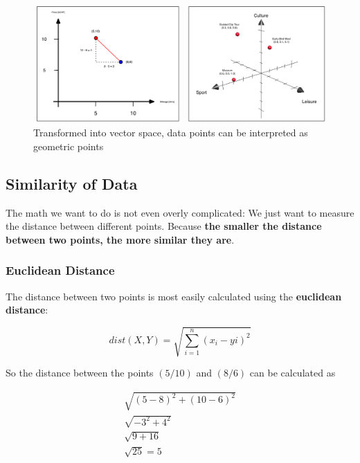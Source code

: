 \documentclass[11pt]{article}
\begin{document}
\begin{figure}[htb!]
    \centering
    \includegraphics[keepaspectratio=true, width=\linewidth]{geometric_interpretation.png}
    \caption{Transformed into vector space, data points can be interpreted as geometric points}
    \label{fig:geometric_intepretation}
\end{figure}

\newpage

\subsection{Similarity of Data}

The math we want to do is not even overly complicated: We just want to measure the distance between different points. Because \textbf{the smaller the distance between two points, the more similar they are}.

\subsubsection{Euclidean Distance}

The distance between two points is most easily calculated using the \textbf{euclidean distance}:

\begin{equation}
    dist(X,Y)= \sqrt{\sum^{n}_{i=1}(x_{i}-y{i})^2}
\end{equation}

So the distance between the points $(5/10)$ and $(8/6)$ can be calculated as

\begin{align}
    \sqrt{(5-8)^2 + (10-6)^2} \\
    \sqrt{-3^2 + 4^2}         \\
    \sqrt{9+16}               \\
    \sqrt{25} = 5
\end{align}

\newpage
\end{document}
